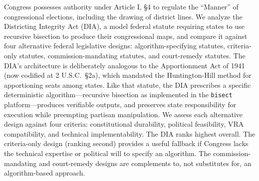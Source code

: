 Congress possesses authority under Article I, \S4 to regulate the ``Manner'' of congressional elections, including the drawing of district lines. We analyze the Districting Integrity Act (DIA), a model federal statute requiring states to use recursive bisection to produce their congressional maps, and compare it against four alternative federal legislative designs: algorithm-specifying statutes, criteria-only statutes, commission-mandating statutes, and court-remedy statutes. The DIA's architecture is deliberately analogous to the Apportionment Act of 1941 (now codified at 2 U.S.C.\ \S2a), which mandated the Huntington-Hill method for apportioning seats among states. Like that statute, the DIA prescribes a specific deterministic algorithm---recursive bisection as implemented in the \texttt{bisect} platform---produces verifiable outputs, and preserves state responsibility for execution while preempting partisan manipulation. We assess each alternative design against four criteria: constitutional durability, political feasibility, VRA compatibility, and technical implementability. The DIA ranks highest overall. The criteria-only design (ranking second) provides a useful fallback if Congress lacks the technical expertise or political will to specify an algorithm. The commission-mandating and court-remedy designs are complements to, not substitutes for, an algorithm-based approach.
